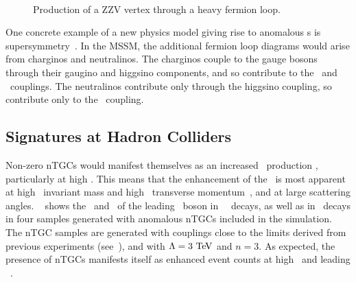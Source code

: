 \begin{figure}
\centering
        \vspace{10mm}
    \mbox{
    }
        \vspace{5mm}
    \caption{Production of a ZZV vertex through a heavy fermion loop. }
    \label{fig:heavy-F-loop}
\end{figure}

One concrete example of a new physics model giving rise to anomalous \nTGC s is
supersymmetry~\cite{Gounaris:2000tb}. In the MSSM, the
additional fermion loop diagrams would arise from charginos and neutralinos. The
charginos couple to the gauge bosons through their gaugino and higgsino
components, and so contribute to the \ffiveZ\ and \ffiveg\ couplings. The
neutralinos contribute only through the higgsino coupling, so 
contribute only to the \ffiveZ\ coupling.

\subsection{Signatures at Hadron Colliders}

Non-zero nTGCs would manifest themselves as an increased \ZZ\
production \cx, particularly at high \sqrtshat. This means that the enhancement
of the \cx\ is most apparent at high \ZZ\ invariant mass and high \Z\ transverse
momentum~\cite{Baur:2000ae}, and at large scattering angles. ~\fig{gen-comp-TGC}
shows the \mZZ\ and \pt\ of the leading \Z\ boson in \sm\ \ZZllll\ decays, as
well as in \ZZllll\ decays in four samples generated with anomalous
nTGCs included in the simulation. The nTGC samples are generated with couplings
close to the limits derived from previous experiments
(see~), and with $\Lambda=3\tev$ and $n=3$.
As expected, the presence of nTGCs manifests itself as enhanced event counts at high
\mZZ\ and leading \Z\ \pt.

